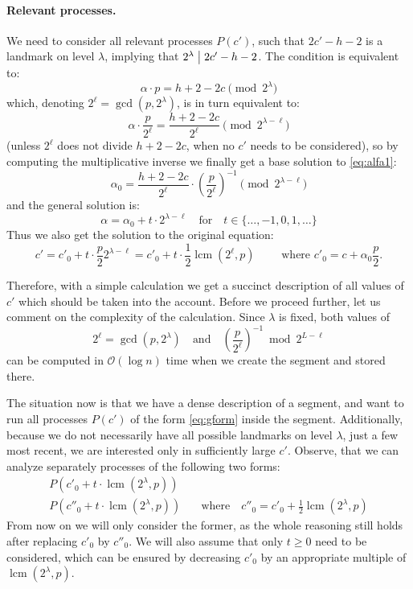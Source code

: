 \documentclass{article}[11pt,letter]
\newcommand{\bigo}{\mathcal{O}}
\newcommand{\divides}{\bigm|}
\newcommand{\level}{\lambda}
\DeclareMathOperator{\lcm}{lcm}
\newcommand{\kpers}{\ensuremath{p}}
\begin{document}
\paragraph{Relevant processes.} We need to consider all relevant processes $P(c')$, such that $2c'-h-2$ is a landmark on level $\level$, implying that
$2^{\level} \divides 2c'-h-2$. The condition is equivalent to:
\begin{equation}
\label{eq:alfa1}
\alpha \cdot \kpers = h+2-2c \pmod{2^{\level}}
\end{equation}
which, denoting $2^{\ell}=\gcd(\kpers,2^{\level})$, is in turn equivalent to:
\[ \alpha \cdot \frac{\kpers}{2^{\ell}} = \frac{h+2-2c}{2^{\ell}} \pmod{2^{\level-\ell}}\]
(unless $2^{\ell}$ does not divide $h+2-2c$, when no $c'$ needs to be considered), so by computing the multiplicative inverse we finally get
a base solution to \eqref{eq:alfa1}:
\[ \alpha_0 = \frac{h+2-2c}{2^{\ell}} \cdot \left(\frac{\kpers}{2^{\ell}}\right)^{-1} \pmod{2^{\level-\ell}}\]
and the general solution is:
\[ \alpha = \alpha_0 + t \cdot 2^{\level-\ell} \quad\text{for}\quad t \in \{\ldots,-1,0,1,\ldots\}\]
Thus we also get the solution to the original equation:
\begin{equation}
\label{eq:gform}
c' = c'_0 +  t \cdot \frac{\kpers}{2}2^{\level-\ell} = c'_0 + t \cdot \frac{1}{2} \lcm(2^\ell,\kpers) \qquad \textrm{ where } c'_0 = c+ \alpha_0 \frac{\kpers}{2}.
\end{equation}

Therefore, with a simple calculation we get a succinct description of all values of $c'$ which should be taken into the account.
Before we proceed further, let us comment on the complexity of the calculation. Since $\level$ is fixed, both values of
\[2^{\ell}=\gcd(\kpers,2^{\level}) \quad\text{and}\quad \left(\frac{\kpers}{2^{\ell}}\right)^{-1}\bmod{2^{L-\ell}}\]
can be computed in $\bigo(\log n)$ time when we create the segment and stored there.

The situation now is that we have a dense description of a segment, and want to run all processes $P(c')$ of the form \eqref{eq:gform}
inside the segment. Additionally, because we do not necessarily have all possible landmarks on level $\level$, just a few most recent,
we are interested only in sufficiently large $c'$. Observe, that we can analyze separately processes of the following two forms:
\begin{eqnarray}
P(c'_0 + t \cdot \lcm(2^\level,\kpers)) & \label{eq:4} \\
P(c''_0 + t \cdot \lcm(2^\level,\kpers)) &\quad\text{where}\quad c''_0 = c'_0 + \frac{1}{2}\lcm(2^\level,\kpers) \label{eq:5}
\end{eqnarray}
From now on we will only consider the former, as the whole reasoning still holds after replacing $c'_0$ by $c''_0$. We will also assume
that only $t\geq 0$ need to be considered, which can be  ensured by decreasing $c'_{0}$ by an appropriate multiple of
$\lcm(2^{\level},\kpers)$.
\end{document}
